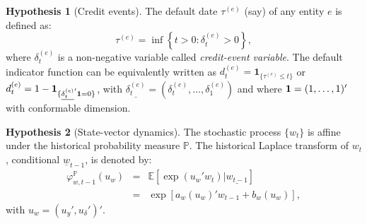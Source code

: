 \documentclass[
  12pt,
]{book}
\theoremstyle{definition}
\theoremstyle{definition}
\theoremstyle{definition}
\theoremstyle{definition}
\newtheorem{hypothesis}{Hypothesis}[chapter]
\theoremstyle{remark}
\begin{document}
\begin{hypothesis}[Credit events]
\protect\hypertarget{hyp:H1}{}\label{hyp:H1}The default date \(\tau^{(e)}\) (say) of any entity \(e\) is defined as:
\begin{equation}
\tau^{(e)} = \inf \left\{ t > 0 : \delta^{(e)}_t > 0 \right\},\label{eq:defaulttime}
\end{equation}
where \(\delta^{(e)}_t\) is a non-negative variable called \emph{credit-event variable}. The default indicator function can be equivalently written as \(d^{(e)}_t = \textbf{1}_{ \{ \tau^{(e)} \leq t \} }\) or \(d^{(e)}_t = 1 - \textbf{1}_{ \{ \underline{\delta^{(e)}_t} ' {\bf 1} = 0 \} }\), with \(\underline{\delta^{(e)}_t} = (\delta^{(e)}_t, \ldots, \delta^{(e)}_1)\) and
where \({\bf 1} = (1, \ldots, 1)'\) with conformable dimension.
\end{hypothesis}

\begin{hypothesis}[State-vector dynamics]
\protect\hypertarget{hyp:H2}{}\label{hyp:H2}The stochastic process \(\{w_t\}\) is affine under the historical probability measure \(\mathbb{P}\). The historical Laplace transform of \(w_t\), conditional \(\underline{w}_{t-1}\), is denoted by:
\begin{eqnarray}
\varphi^{\mathbb{P}}_{w, t-1} (u_w) &=& \mathbb{E} \left[\exp( u_w ' w_t )   |   \underline{w_{t-1}} \right] \nonumber \\
&=& \exp \left[ a_{w} (u_{w}) ' w_{t-1} + b_{w} (u_{w}) \right],\label{eq:affinePcLT}
\end{eqnarray}
with \(u_w = (u_y ', u_{\delta} ')'\).
\end{hypothesis}
\end{document}
